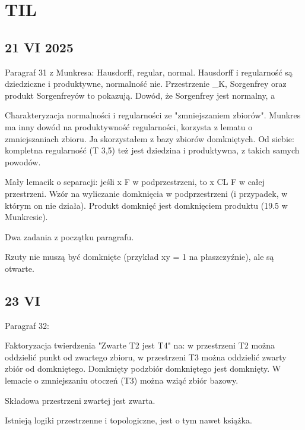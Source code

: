 \chapter{TIL}

\section{21 VI 2025}

Paragraf 31 z Munkresa: Hausdorff, regular, normal. Hausdorff i regularność są dziedziczne i produktywne, normalność nie. Przestrzenie \RR_K, Sorgenfrey oraz produkt Sorgenfreyów to pokazują. Dowód, że Sorgenfrey jest normalny, a 

Charakteryzacja normalności i regularności ze "zmniejszaniem zbiorów".
Munkres ma inny dowód na produktywność regularności, korzysta z lematu o zmniejszaniach zbioru. Ja skorzystałem z bazy zbiorów domkniętych.
Od siebie: kompletna regularność (T 3,5) też jest dziedzina i produktywna, z takich samych powodów.

Mały lemacik o separacji: jeśli x \not\in F w podprzestrzeni, to x \not\in CL F w całej przestrzeni.
Wzór na wyliczanie domknięcia w podprzestrzeni (i przypadek, w którym on nie działa).
Produkt domknięć jest domknięciem produktu (19.5 w Munkresie).

Dwa zadania z początku paragrafu.

Rzuty nie muszą być domknięte (przykład xy = 1 na płaszczyźnie), ale są otwarte.

\section{23 VI}

Paragraf 32:

Faktoryzacja twierdzenia "Zwarte T2 jest T4" na: w przestrzeni T2 można oddzielić punkt od zwartego zbioru, w przestrzeni T3 można oddzielić zwarty zbiór od domkniętego. Domknięty podzbiór domkniętego jest domknięty. W lemacie o zmniejszaniu otoczeń (T3) można wziąć zbiór bazowy.

Składowa przestrzeni zwartej jest zwarta.

Istnieją logiki przestrzenne i topologiczne, jest o tym nawet książka.
